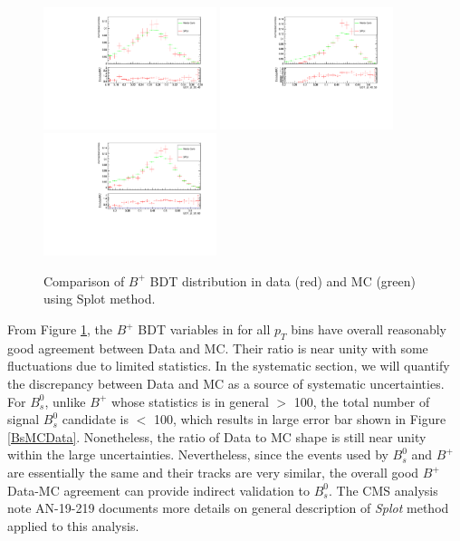 \begin{figure}[h]
\begin{center}
\includegraphics[width=0.45\textwidth]{Figures/Chapter5/BDT_pt_30_40_mc_validation_Bu.pdf}
\includegraphics[width=0.45\textwidth]{Figures/Chapter5/BDT_pt_40_50_mc_validation_Bu.pdf}
\includegraphics[width=0.45\textwidth]{Figures/Chapter5/BDT_pt_50_60_mc_validation_Bu.pdf}
\caption{Comparison of $B^+$ BDT distribution in data (red) and MC (green) using Splot method.}
\label{BPMCData}
\end{center}
\end{figure}

From Figure \ref{BPMCData}, the $B^+$ BDT variables in for all $p_T$ bins have overall reasonably good agreement between Data and MC. Their ratio is near unity with some fluctuations due to limited statistics. In the systematic section, we will quantify the discrepancy between Data and MC as a source of systematic uncertainties. For $B^0_s$, unlike $B^+$ whose statistics is in general $>$ 100, the total number of signal $B^0_s$ candidate is $<$ 100, which results in large error bar shown in Figure \ref{BsMCData}. Nonetheless, the ratio of Data to MC shape is still near unity within the large uncertainties. Nevertheless, since the events used by $B^0_s$ and $B^+$ are essentially the same and their tracks are very similar, the overall good $B^+$ Data-MC agreement can provide indirect validation to $B^0_s$. The CMS analysis note AN-19-219 \cite{AN-19-219} documents more details on general description of \textit{Splot} method applied to this analysis.  


